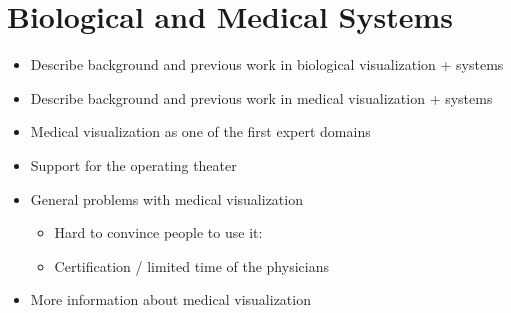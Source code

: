 \section{Biological and Medical Systems}
\label{contributions:medbio}
\begin{itemize}
\item Describe background and previous work in biological visualization + systems
\item Describe background and previous work in medical visualization + systems
\item Medical visualization as one of the first expert domains
\item Support for the operating theater
\item General problems with medical visualization
\begin{itemize}
    \item Hard to convince people to use it:
    \item Certification / limited time of the physicians
\end{itemize}
\item More information about medical visualization \cite{preim2007visualization}
\end{itemize}

